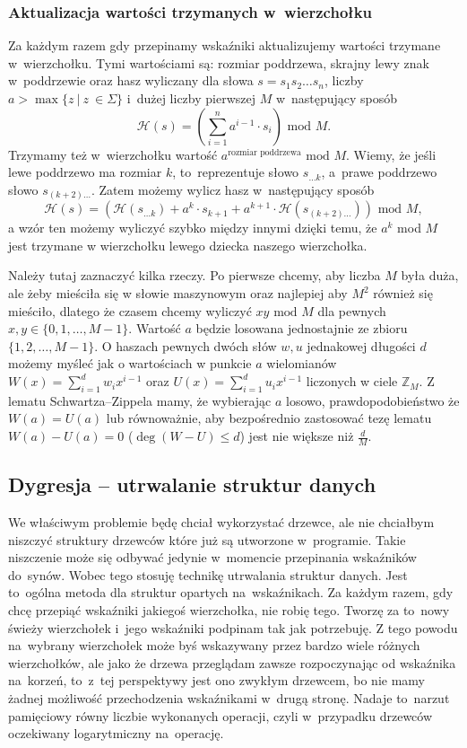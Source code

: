\documentclass[declaration,shortabstract]{iithesis}
\theoremstyle{definition} \newtheorem{definition}{Definicja}[chapter]
\theoremstyle{plain} \newtheorem{remark}[definition]{Obserwacja}
\theoremstyle{plain} \newtheorem{theorem}[definition]{Twierdzenie}
\theoremstyle{plain} \newtheorem{example}{Przykład}[definition]
\theoremstyle{plain} \newtheorem{lemma}[definition]{Lemat}
\begin{document}
\subsubsection{Aktualizacja wartości trzymanych w~wierzchołku}

Za każdym razem gdy przepinamy wskaźniki aktualizujemy wartości trzymane w~wierzchołku. Tymi wartościami są: rozmiar poddrzewa, skrajny lewy znak w~poddrzewie oraz hasz wyliczany dla słowa $s = s_1 s_2 \ldots s_n$, liczby $a > \max \{ z\ |\ z~\in \Sigma \}$ i~dużej liczby pierwszej $M$ w~następujący sposób $$\mathcal{H}(s) = (\sum_{i=1}^n a^{i-1} \cdot s_i) \text{ mod } M.$$ Trzymamy też w~wierzchołku wartość $a^{\text{rozmiar poddrzewa}} \text{ mod } M$. Wiemy, że jeśli lewe poddrzewo ma rozmiar $k$, to~reprezentuje słowo $s_{\ldots k}$, a~prawe poddrzewo słowo $s_{(k + 2) \ldots}$. Zatem możemy wylicz hasz w~następujący sposób $$ \mathcal{H}(s) = (\mathcal{H}(s_{\ldots k}) + a^k \cdot s_{k+1} + a^{k+1} \cdot \mathcal{H}(s_{(k+2) \ldots})) \text{ mod } M,$$ a wzór ten możemy wyliczyć szybko między innymi dzięki temu, że $a^k$ mod $M$ jest trzymane w wierzchołku lewego dziecka naszego wierzchołka.

Należy tutaj zaznaczyć kilka rzeczy. Po pierwsze chcemy, aby liczba $M$ była duża, ale żeby mieściła się w słowie maszynowym oraz najlepiej aby $M^2$ również się mieściło, dlatego że czasem chcemy wyliczyć $xy \text{ mod } M$ dla pewnych $x, y \in \{0, 1, \ldots, M - 1\}$. Wartość $a$ będzie losowana jednostajnie ze zbioru $\{1, 2, \ldots, M - 1\}$. O haszach pewnych dwóch słów $w, u$ jednakowej długości $d$ możemy myśleć jak o wartościach w punkcie $a$ wielomianów $W(x) = \sum_{i=1}^d w_i x^{i-1}$ oraz $U(x) = \sum_{i=1}^d u_i x^{i-1}$ liczonych w ciele $\mathbb{Z}_M$. Z lematu Schwartza–Zippela \cite{schwartz} mamy, że wybierając $a$ losowo, prawdopodobieństwo że $W(a) = U(a)$ lub równoważnie, aby bezpośrednio zastosować tezę lematu $W(a) - U(a) = 0$ ($\deg(W - U) \leq d$) jest nie większe niż $\frac{d}{M}$.

\subsection{Dygresja -- utrwalanie struktur danych}

We właściwym problemie będę chciał wykorzystać drzewce, ale nie chciałbym niszczyć struktury drzewców które już są utworzone w~programie. Takie niszczenie może się odbywać jedynie w~momencie przepinania wskaźników do~synów. Wobec tego stosuję technikę utrwalania struktur danych. Jest to~ogólna metoda dla struktur opartych na~wskaźnikach. Za każdym razem, gdy chcę przepiąć wskaźniki jakiegoś wierzchołka, nie robię tego. Tworzę za to~nowy świeży wierzchołek i~jego wskaźniki podpinam tak jak potrzebuję. Z tego powodu na~wybrany wierzchołek może byś wskazywany przez bardzo wiele różnych wierzchołków, ale jako że drzewa przeglądam zawsze rozpoczynając od wskaźnika na~korzeń, to~z~tej perspektywy jest ono zwykłym drzewcem, bo nie mamy żadnej możliwość przechodzenia wskaźnikami w~drugą stronę. Nadaje to~narzut pamięciowy równy liczbie wykonanych operacji, czyli w~przypadku drzewców oczekiwany logarytmiczny na~operację.
\end{document}
